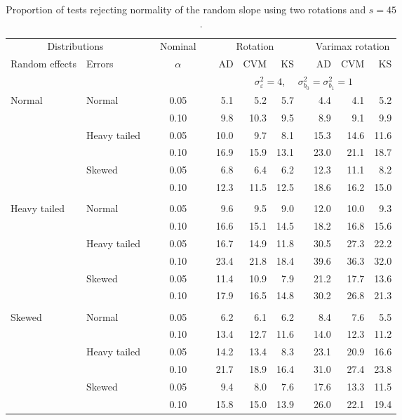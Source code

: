 \begin{table}[ht]
\centering
\caption{\label{tab:fixedsimb145} Proportion of tests rejecting normality of the random slope using two rotations and $s = 45$.}
\begin{scriptsize}
\begin{tabular}{ll p{.1cm} c p{.1cm} rrr p{.1cm} rrr}
  \hline
  \multicolumn{2}{c}{Distributions}& & Nominal & &  \multicolumn{3}{c}{Rotation} & & \multicolumn{3}{c}{Varimax rotation} \\ \cline{1-2} \cline{6-8} \cline{10-12}   
  Random effects & Errors & & $\alpha$ & & AD & CVM & KS & & AD & CVM & KS \\ 
   \hline
& && && \multicolumn{7}{c}{$\sigma_{\varepsilon}^2 = 4$, \ \ $\sigma_{b_0}^2 = \sigma_{b_1}^2 = 1$} \\ \cline{6-12}
\rowcolor{gray!20} Normal & Normal &  & 0.05 &  & 5.1 & 5.2 & 5.7 &  & 4.4 & 4.1 & 5.2 \\ 
\rowcolor{gray!20}    &  &  & 0.10 &  & 9.8 & 10.3 & 9.5 &  & 8.9 & 9.1 & 9.9 \\ 
\rowcolor{gray!20}    & Heavy tailed &  & 0.05 &  & 10.0 & 9.7 & 8.1 &  & 15.3 & 14.6 & 11.6 \\ 
\rowcolor{gray!20}    &  &  & 0.10 &  & 16.9 & 15.9 & 13.1 &  & 23.0 & 21.1 & 18.7 \\ 
\rowcolor{gray!20}    & Skewed &  & 0.05 &  & 6.8 & 6.4 & 6.2 &  & 12.3 & 11.1 & 8.2 \\ 
\rowcolor{gray!20}    &  &  & 0.10 &  & 12.3 & 11.5 & 12.5 &  & 18.6 & 16.2 & 15.0 \\ 
&&&&&&&&&&&\\
  Heavy tailed & Normal &  & 0.05 &  & 9.6 & 9.5 & 9.0 &  & 12.0 & 10.0 & 9.3 \\ 
   &  &  & 0.10 &  & 16.6 & 15.1 & 14.5 &  & 18.2 & 16.8 & 15.6 \\ 
   & Heavy tailed &  & 0.05 &  & 16.7 & 14.9 & 11.8 &  & 30.5 & 27.3 & 22.2 \\ 
   & &  & 0.10 &  & 23.4 & 21.8 & 18.4 &  & 39.6 & 36.3 & 32.0 \\ 
   & Skewed &  & 0.05 &  & 11.4 & 10.9 & 7.9 &  & 21.2 & 17.7 & 13.6 \\ 
   &  &  & 0.10 &  & 17.9 & 16.5 & 14.8 &  & 30.2 & 26.8 & 21.3 \\ 
&&&&&&&&&&&\\
  Skewed & Normal &  & 0.05 &  & 6.2 & 6.1 & 6.2 &  & 8.4 & 7.6 & 5.5 \\ 
   &  &  & 0.10 &  & 13.4 & 12.7 & 11.6 &  & 14.0 & 12.3 & 11.2 \\ 
   & Heavy tailed &  & 0.05 &  & 14.2 & 13.4 & 8.3 &  & 23.1 & 20.9 & 16.6 \\ 
   &  &  & 0.10 &  & 21.7 & 18.9 & 16.4 &  & 31.0 & 27.4 & 23.8 \\ 
   & Skewed &  & 0.05 &  & 9.4 & 8.0 & 7.6 &  & 17.6 & 13.3 & 11.5 \\ 
   &  &  & 0.10 &  & 15.8 & 15.0 & 13.9 &  & 26.0 & 22.1 & 19.4 \\ 


\end{tabular}
\end{scriptsize}
\end{table}
